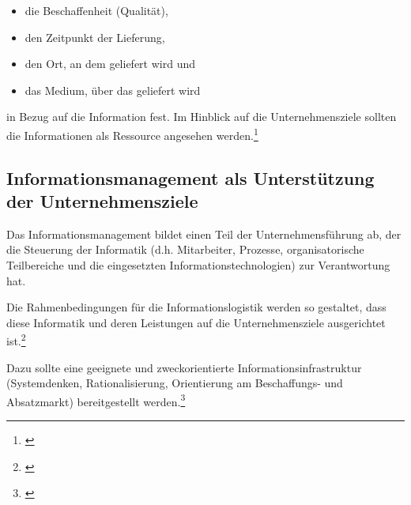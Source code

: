 \begin{itemize}
	\item die Beschaffenheit (Qualität),
	\item den Zeitpunkt der Lieferung,
	\item den Ort, an dem geliefert wird und
	\item das Medium, über das geliefert wird		 
\end{itemize}
in Bezug auf die Information fest. Im Hinblick auf die Unternehmensziele sollten die Informationen als Ressource angesehen werden.\footnote{\cite{bode_informationsbegriff_1997}} 

\subsection{Informationsmanagement als Unterstützung der Unternehmensziele}
Das Informationsmanagement bildet einen Teil der Unternehmensführung ab, der die Steuerung der Informatik (d.h. Mitarbeiter, Prozesse, organisatorische Teilbereiche und die eingesetzten Informationstechnologien) zur Verantwortung hat.

Die Rahmenbedingungen für die Informationslogistik werden so gestaltet, dass diese Informatik und deren Leistungen auf die Unternehmensziele ausgerichtet ist.\footnote{\cite{voss_informationsmanagement_2001}}

Dazu sollte eine geeignete und zweckorientierte Informationsinfrastruktur (Systemdenken, Rationalisierung, Orientierung am Beschaffungs- und Absatzmarkt) bereitgestellt werden.\footnote{\cite{Vgl. u.a. Vieweger, Bernd; Informationsmanagement; 2013}}
